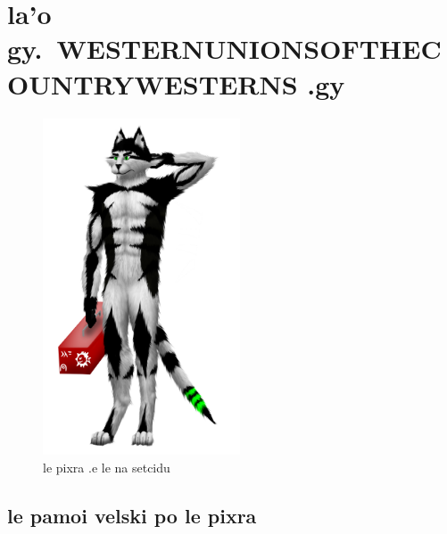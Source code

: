 \documentclass{report}
\newcommand\imageheight{10cm}
\begin{document}
\chapter{la'o gy.\ WESTERNUNIONSOFTHECOUNTRYWESTERNS .gy}
\begin{figure}[ht]
	\centering
	\includegraphics[height=\imageheight]{50x/toolbox/westernunionsofthecountrywesterns.png}
	\caption[center]{le pixra .e le na setcidu}
\end{figure}
\section{le pamoi velski po le pixra}
\end{document}
